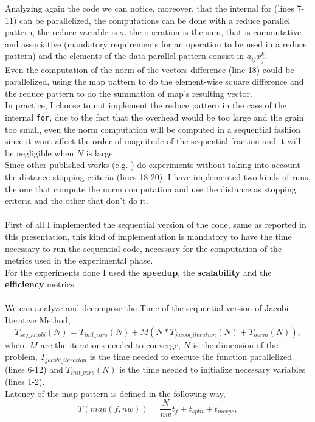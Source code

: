 \documentclass[12pt]{extarticle}
\begin{document}
Analyzing again the code we can notice, moreover, that the internal for (lines 7-11) can be parallelized, the computations can be done with a reduce parallel pattern, the reduce variable is $\sigma$, the operation is the sum, that is commutative and associative (mandatory requirements for an operation to be used in a reduce pattern) and the elements of the data-parallel pattern consist in $a_{ij}x_j^k$.\\
Even the computation of the norm of the vectors difference (line 18) could be parallelized, using the map pattern to do the element-wise square difference and the reduce pattern to do the summation of map's resulting vector.\\
In practice, I choose to not implement the reduce pattern in the case of the internal \texttt{for}, due to the fact that the overhead would be too large and the grain too small, even the norm computation will be computed in a sequential fashion since it wont affect the order of magnitude of the sequential fraction and it will be negligible when $N$ is large.\\
Since other published works (e.g. \cite{margaris2014parallel}) do experiments without taking into account the distance stopping criteria (lines 18-20), I have implemented two kinds of runs, the one that compute the norm computation and use the distance as stopping criteria and the other that don't do it.\\\\
First of all I implemented the sequential version of the code, same as reported in this presentation, this kind of implementation is mandatory to have the time necessary to run the sequential code, necessary for the computation of the metrics used in the experimental phase.\\
For the experiments done I used the \textbf{speedup}, the \textbf{scalability} and the \textbf{efficiency} metrics.\\\\
We can analyze and decompose the Time of the sequential version of Jacobi Iterative Method,
\[T_{seq\_jacobi}(N) = T_{init\_vars}(N) + M(N*T_{jacobi\_iteration}(N) + T_{norm}(N)),\]
where $M$ are the iterations needed to converge, $N$ is the dimension of the problem, $T_{jacobi\_iteration}$ is the time needed to execute the function parallelized (lines 6-12) and $T_{init\_vars}(N)$ is the time needed to initialize necessary variables (lines 1-2).\\ 
Latency of the map pattern is defined in the following way,
\[T(map(f, nw)) = \frac{N}{nw}t_f + t_{split} + t_{merge},\]
\end{document}
